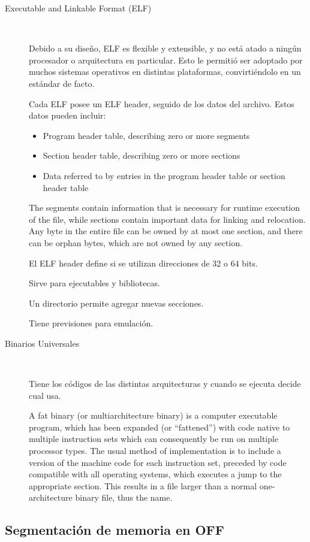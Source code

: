 \documentclass[a4paper, twoside]{article}
\begin{document}
\begin{description}
  \item[Executable and Linkable Format (ELF)] ~

  Debido a su diseño, ELF es flexible y extensible, y no está atado a ningún
  procesador o arquitectura en particular.
  Esto le permitió ser adoptado por muchos sistemas operativos en distintas
  plataformas, convirtiéndolo en un estándar de facto.

  Cada ELF posee un ELF header, seguido de los datos del archivo.
  Estos datos pueden incluir:
  \begin{itemize}
    \item Program header table, describing zero or more segments
    \item Section header table, describing zero or more sections
    \item Data referred to by entries in the program header table or section
    header table
  \end{itemize}

  The segments contain information that is necessary for runtime execution of
  the file, while sections contain important data for linking and relocation.
  Any byte in the entire file can be owned by at most one section, and there
  can be orphan bytes, which are not owned by any section.

  El ELF header define si se utilizan direcciones de 32 o 64 bits.

  Sirve para ejecutables y bibliotecas.

  Un directorio permite agregar nuevas secciones.

  Tiene previsiones para emulación.

  \item[Binarios Universales] ~

  Tiene los códigos de las distintas arquitecturas y cuando se ejecuta decide
  cual usa.

  A fat binary (or multiarchitecture binary) is a computer executable program,
  which has been expanded (or ``fattened'') with code native to multiple
  instruction sets which can consequently be run on multiple processor types.
  The usual method of implementation is to include a version of the machine
  code for each instruction set, preceded by code compatible with all operating
  systems, which executes a jump to the appropriate section.
  This results in a file larger than a normal one-architecture binary file,
  thus the name.
\end{description}

\subsection{Segmentación de memoria en OFF}
\end{document}
